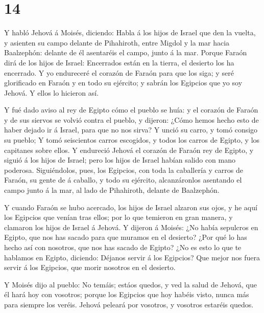\hypertarget{section-13}{%
\section{14}\label{section-13}}

 Y habló Jehová á Moisés, diciendo:  Habla á los
hijos de Israel que den la vuelta, y asienten su campo delante de
Pihahiroth, entre Migdol y la mar hacia Baalzephón: delante de él
asentaréis el campo, junto á la mar.  Porque Faraón dirá de
los hijos de Israel: Encerrados están en la tierra, el desierto los ha
encerrado.  Y yo endureceré el corazón de Faraón para que
los siga; y seré glorificado en Faraón y en todo su ejército; y sabrán
los Egipcios que yo soy Jehová. Y ellos lo hicieron así.

 Y fué dado aviso al rey de Egipto cómo el pueblo se huía: y
el corazón de Faraón y de sus siervos se volvió contra el pueblo, y
dijeron: ¿Cómo hemos hecho esto de haber dejado ir á Israel, para que no
nos sirva?  Y unció su carro, y tomó consigo su pueblo;
 Y tomó seiscientos carros escogidos, y todos los carros de
Egipto, y los capitanes sobre ellos.  Y endureció Jehová el
corazón de Faraón rey de Egipto, y siguió á los hijos de Israel; pero
los hijos de Israel habían salido con mano poderosa. 
Siguiéndolos, pues, los Egipcios, con toda la caballería y carros de
Faraón, su gente de á caballo, y todo su ejército, alcanzáronlos
asentando el campo junto á la mar, al lado de Pihahiroth, delante de
Baalzephón.

 Y cuando Faraón se hubo acercado, los hijos de Israel
alzaron sus ojos, y he aquí los Egipcios que venían tras ellos; por lo
que temieron en gran manera, y clamaron los hijos de Israel á Jehová.
 Y dijeron á Moisés: ¿No había sepulcros en Egipto, que nos
has sacado para que muramos en el desierto? ¿Por qué lo has hecho así
con nosotros, que nos has sacado de Egipto?  ¿No es esto lo
que te hablamos en Egipto, diciendo: Déjanos servir á los Egipcios? Que
mejor nos fuera servir á los Egipcios, que morir nosotros en el
desierto.

 Y Moisés dijo al pueblo: No temáis; estáos quedos, y ved
la salud de Jehová, que él hará hoy con vosotros; porque los Egipcios
que hoy habéis visto, nunca más para siempre los veréis. 
Jehová peleará por vosotros, y vosotros estaréis quedos.

